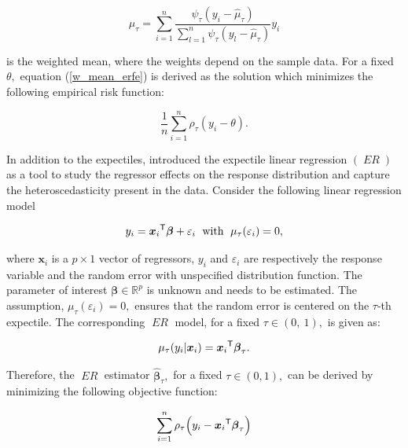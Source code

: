 \documentclass[15pt,a4paper]{article}
\newcommand{\transpose}{{}^{\text{\sffamily T}}}
\DeclareMathOperator{\ER}{\textit{ER}}
\begin{document}
\begin{equation}\label{w_mean_erfe}
    \widehat{\mu}_{\tau}=\sum_{i=1}^{n}\frac{\psi_{\tau}(y_i-\widehat{\mu}_{\tau})}{\sum_{l=1}^{n}\psi_{\tau}(y_l-\widehat{\mu}_{\tau})}y_i
\end{equation}

is the weighted mean, where the weights depend on the sample data. For a fixed \(\theta,\) equation (\ref{w_mean_erfe}) is derived as the solution which minimizes the following empirical risk function:

\begin{equation}\label{exp3_erfe}
\frac{1}{n}\sum_{i=1}^{n}\rho_\tau(y_i-\theta).
\end{equation}

In addition to the expectiles, \citet{newey_asymmetric_1987} introduced the expectile linear regression $(\ER)$ as a tool to study the regressor effects on the response distribution and capture the heteroscedasticity present in the data. Consider the following linear regression model

\begin{equation}\label{lineareg_erfe}
    y_{i}=\boldsymbol{x}_{i}\transpose\boldsymbol{\beta} + \varepsilon_i \; \mbox{ with } \; \mu_{\tau}(\varepsilon_i)=0,
\end{equation}

where \(\boldsymbol{x}_i\) is a \(p\times 1\) vector of regressors, \(y_i\) and \(\varepsilon_i\) are respectively the response variable and the random error with unspecified distribution function. The parameter of interest \(\boldsymbol{\beta} \in \mathbb{R}^p\) is unknown and needs to be estimated. The assumption, \(\mu_{\tau}(\varepsilon_{i})=0,\) ensures that the random error is centered on the \(\tau\)-th expectile. The corresponding $\ER$ model, for a fixed \(\tau \in (0,\ 1),\) is given as:

\begin{equation}\label{explineareg_erfe}
\mu_{\tau}(y_i|\boldsymbol{x}_{i})=\boldsymbol{x}_{i}\transpose\boldsymbol{\beta}_{\tau}.
\end{equation}

Therefore, the $\ER$ estimator \(\widehat{\boldsymbol{\beta}}_{\tau},\) for a fixed \(\tau \in (0,1),\) can be derived by minimizing 
the following objective function:

\begin{equation*}
\sum_{i=1}^{n}\rho_\tau\Big(y_{i}-\boldsymbol{x}_i\transpose\boldsymbol{\beta}_{\tau}\Big)
\end{equation*}
\end{document}
